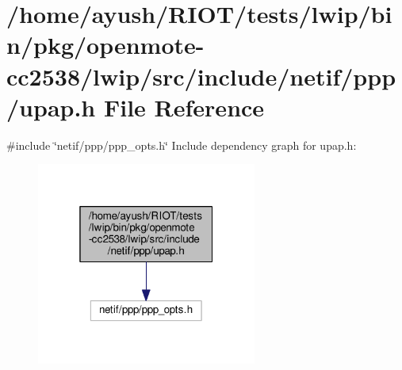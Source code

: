 \hypertarget{openmote-cc2538_2lwip_2src_2include_2netif_2ppp_2upap_8h}{}\section{/home/ayush/\+R\+I\+O\+T/tests/lwip/bin/pkg/openmote-\/cc2538/lwip/src/include/netif/ppp/upap.h File Reference}
\label{openmote-cc2538_2lwip_2src_2include_2netif_2ppp_2upap_8h}
{\ttfamily \#include \char`\"{}netif/ppp/ppp\+\_\+opts.\+h\char`\"{}}\newline
Include dependency graph for upap.\+h\+:
\nopagebreak
\begin{figure}[H]
\begin{center}
\leavevmode
\includegraphics[width=205pt]{openmote-cc2538_2lwip_2src_2include_2netif_2ppp_2upap_8h__incl}
\end{center}
\end{figure}

